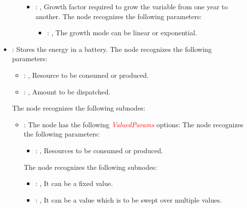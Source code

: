 \begin{itemize}
\begin{itemize}
\begin{itemize}
            \item {}: , 
              Growth factor required to grow the variable from one year to another.
              The  node recognizes the following parameters:
                \begin{itemize}
                  \item {}: , 
                    The growth mode can be linear or exponential.
              \end{itemize}
          \end{itemize}
      \end{itemize}

    \item {}:
      Stores the energy in a battery.
      The  node recognizes the following parameters:
        \begin{itemize}
          \item {}: , 
            Resource to be consumed or produced.
          \item {}: , 
            Amount to be dispatched.
      \end{itemize}

      The  node recognizes the following subnodes:
      \begin{itemize}
        \item {}:
          The node  has the following \textcolor{red}{\textit{ValuedParams}}
          options:
          The  node recognizes the following parameters:
            \begin{itemize}
              \item {}: , 
                Resources to be consumed or produced.
          \end{itemize}

          The  node recognizes the following subnodes:
          \begin{itemize}
            \item {}: , 
              It can be a fixed value.

            \item {}: , 
              It can be a value which is to be swept over multiple values.


\end{itemize}
\end{itemize}
\end{itemize}
